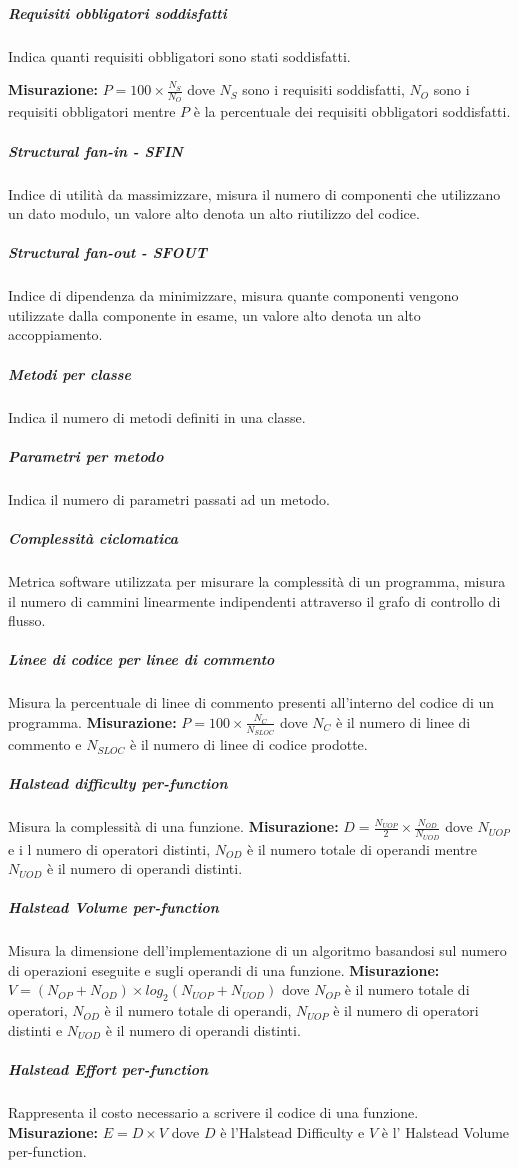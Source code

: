 \subparagraph{Requisiti obbligatori soddisfatti} \Spazio
Indica quanti requisiti obbligatori sono stati soddisfatti.

\textbf{Misurazione:} $P=100\times\frac{N_S}{N_O}$ dove $N_S$ sono i requisiti soddisfatti, $N_O$ sono i requisiti obbligatori mentre $P$ è la percentuale dei requisiti obbligatori soddisfatti.

\subparagraph{Structural fan-in - SFIN} \Spazio
Indice di utilità da massimizzare, misura il numero di componenti che utilizzano un dato modulo, un valore alto denota un alto riutilizzo del codice.

\subparagraph{Structural fan-out - SFOUT} \Spazio
Indice di dipendenza da minimizzare, misura quante componenti vengono utilizzate dalla componente in esame, un valore alto denota un alto accoppiamento.

\subparagraph{Metodi per classe} \Spazio
Indica il numero di metodi definiti in una classe.

\subparagraph{Parametri per metodo} \Spazio
Indica il numero di parametri passati ad un metodo.

\subparagraph{Complessità ciclomatica} \Spazio
Metrica software utilizzata per misurare la complessità di un programma, misura il numero di cammini linearmente indipendenti attraverso il grafo di controllo di flusso.

\subparagraph{Linee di codice per linee di commento} \Spazio
Misura la percentuale di linee di commento presenti all'interno del codice di un programma.
\textbf{Misurazione:} $P=100\times\frac{N_C}{N_{SLOC}}$ dove $N_C$ è il numero di linee di commento e $N_{SLOC}$ è il numero di linee di codice prodotte.

\subparagraph{Halstead difficulty per-function} \Spazio
Misura la complessità di una funzione.
\textbf{Misurazione:} $D=\frac{N_{UOP}}{2}\times\frac{N_{OD}}{N_{UOD}}$ dove $N_{UOP}$ e i l numero di operatori distinti, $N_{OD}$ è il numero totale di operandi mentre $N_{UOD}$ è il numero di operandi distinti.

\subparagraph{Halstead Volume per-function} \Spazio
Misura la dimensione dell'implementazione di un algoritmo basandosi sul numero di operazioni eseguite e sugli operandi di una funzione.
\textbf{Misurazione:} $V=(N_{OP} + N_{OD})\times log_2(N_{UOP} + N_{UOD})$  dove $N_{OP}$ è il numero totale di operatori, $N_{OD}$ è il numero totale di operandi, $N_{UOP}$ è il numero di operatori distinti e $N_{UOD}$ è il numero di operandi distinti.
	
\subparagraph{Halstead Effort per-function} \Spazio
Rappresenta il costo necessario a scrivere il codice di una funzione.
\textbf{Misurazione:} $E=D\times V$ dove $D$ è l'Halstead Difficulty e $V$ è l' Halstead Volume per-function.
	
